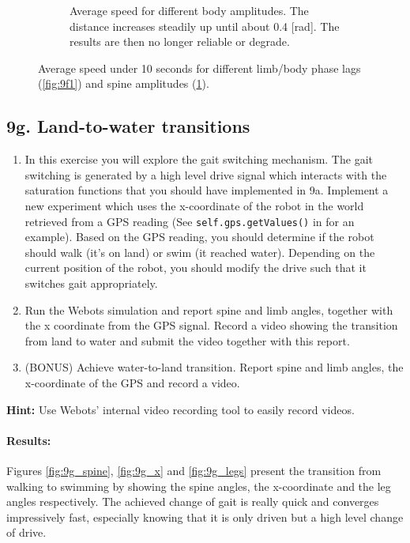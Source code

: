 \documentclass{cmc}
\begin{document}
\begin{figure}[!ht]
\begin{subfigure}[b]{0.48\textwidth}
    \caption{Average speed for different body amplitudes. The distance increases steadily up until about 0.4 [rad]. The results are then no longer reliable or degrade. }
    \label{fig:9f2}
  \end{subfigure}
  \caption{Average speed under 10 seconds for different limb/body phase lags (\ref{fig:9f1}) and spine amplitudes (\ref{fig:9f2}).}
  \label{fig:9f}
\end{figure}




\subsection*{9g. Land-to-water transitions}

\begin{enumerate}
\item In this exercise you will explore the gait switching mechanism. The gait
  switching is generated by a high level drive signal which interacts with the
  saturation functions that you should have implemented in 9a. Implement a new
  experiment which uses the x-coordinate of the robot in the world retrieved
  from a GPS reading (See \texttt{self.gps.getValues()} in
   for an example). Based on the GPS reading,
  you should determine if the robot should walk (it’s on land) or swim (it
  reached water). Depending on the current position of the robot, you should
  modify the drive such that it switches gait appropriately.
\item Run the Webots simulation and report spine and limb angles, together with
  the x coordinate from the GPS signal. Record a video showing the transition
  from land to water and submit the video together with this report.
\item (BONUS) Achieve water-to-land transition. Report spine and limb angles,
  the x-coordinate of the GPS and record a video.
\end{enumerate}

\textbf{Hint:} Use Webots’ internal video recording tool to easily record
videos.

\paragraph{Results:}
Figures \ref{fig:9g_spine}, \ref{fig:9g_x} and \ref{fig:9g_legs} present the transition from walking to swimming by showing the spine angles, the x-coordinate and the leg angles respectively. The achieved change of gait is really quick and converges impressively fast, especially knowing that it is only driven but a high level change of drive. 
\end{document}
